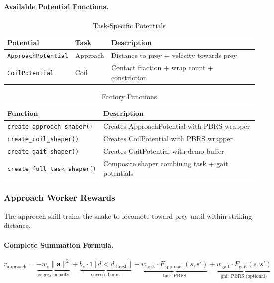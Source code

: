 \documentclass[11pt]{article}
\begin{document}
\paragraph{Available Potential Functions.}

\begin{table}[H]
\centering
\caption{Task-Specific Potentials}
\begin{tabular}{@{}lll@{}}
\toprule
\textbf{Potential} & \textbf{Task} & \textbf{Description} \\
\midrule
\texttt{ApproachPotential} & Approach & Distance to prey + velocity towards prey \\
\texttt{CoilPotential} & Coil & Contact fraction + wrap count + constriction \\
\bottomrule
\end{tabular}
\end{table}

\begin{table}[H]
\centering
\caption{Factory Functions}
\begin{tabular}{@{}ll@{}}
\toprule
\textbf{Function} & \textbf{Description} \\
\midrule
\texttt{create\_approach\_shaper()} & Creates ApproachPotential with PBRS wrapper \\
\texttt{create\_coil\_shaper()} & Creates CoilPotential with PBRS wrapper \\
\texttt{create\_gait\_shaper()} & Creates GaitPotential with demo buffer \\
\texttt{create\_full\_task\_shaper()} & Composite shaper combining task + gait potentials \\
\bottomrule
\end{tabular}
\end{table}

\subsubsection{Approach Worker Rewards}

The approach skill trains the snake to locomote toward prey until within striking distance.

\paragraph{Complete Summation Formula.}
\begin{equation}
    r_{\text{approach}} = \underbrace{-w_e \|\mathbf{a}\|^2}_{\text{energy penalty}}
    + \underbrace{b_s \cdot \mathbf{1}[d < d_{\text{thresh}}]}_{\text{success bonus}}
    + \underbrace{w_{\text{task}} \cdot F_{\text{approach}}(s, s')}_{\text{task PBRS}}
    + \underbrace{w_{\text{gait}} \cdot F_{\text{gait}}(s, s')}_{\text{gait PBRS (optional)}}
\end{equation}
\end{document}
